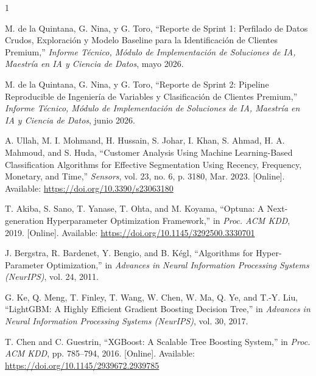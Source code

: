\documentclass[journal,letterpaper]{IEEEtran}
\begin{document}
\begin{thebibliography}{1}

M. de la Quintana, G. Nina, y G. Toro,
``Reporte de Sprint 1: Perfilado de Datos Crudos, Exploración y Modelo Baseline para la Identificación de Clientes Premium,''
\textit{Informe Técnico, Módulo de Implementación de Soluciones de IA, Maestría en IA y Ciencia de Datos}, mayo 2026.

M. de la Quintana, G. Nina, y G. Toro,
``Reporte de Sprint 2: Pipeline Reproducible de Ingeniería de Variables y Clasificación de Clientes Premium,''
\textit{Informe Técnico, Módulo de Implementación de Soluciones de IA, Maestría en IA y Ciencia de Datos}, junio 2026.

A. Ullah, M. I. Mohmand, H. Hussain, S. Johar, I. Khan, S. Ahmad, H. A. Mahmoud, and S. Huda,
``Customer Analysis Using Machine Learning-Based Classification Algorithms for Effective Segmentation Using Recency, Frequency, Monetary, and Time,''
\emph{Sensors}, vol. 23, no. 6, p. 3180, Mar. 2023. [Online]. Available: \url{https://doi.org/10.3390/s23063180}

T. Akiba, S. Sano, T. Yanase, T. Ohta, and M. Koyama,
``Optuna: A Next-generation Hyperparameter Optimization Framework,''
in \textit{Proc. ACM KDD}, 2019. [Online]. Available: \url{https://doi.org/10.1145/3292500.3330701}

J. Bergstra, R. Bardenet, Y. Bengio, and B. Kégl,
``Algorithms for Hyper-Parameter Optimization,''
in \textit{Advances in Neural Information Processing Systems (NeurIPS)}, vol. 24, 2011.

G. Ke, Q. Meng, T. Finley, T. Wang, W. Chen, W. Ma, Q. Ye, and T.-Y. Liu,
``LightGBM: A Highly Efficient Gradient Boosting Decision Tree,''
in \textit{Advances in Neural Information Processing Systems (NeurIPS)}, vol. 30, 2017.

T. Chen and C. Guestrin,
``XGBoost: A Scalable Tree Boosting System,''
in \textit{Proc. ACM KDD}, pp. 785--794, 2016. [Online]. Available: \url{https://doi.org/10.1145/2939672.2939785}

\end{thebibliography}
\end{document}
